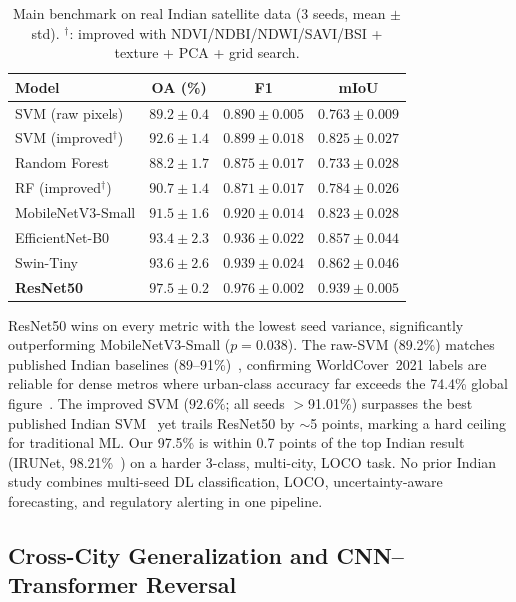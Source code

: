 \documentclass[conference]{IEEEtran}
\begin{document}
\begin{table}[t]
\centering
\caption{Main benchmark on real Indian satellite data (3 seeds, mean $\pm$ std). $^\dagger$: improved with NDVI/NDBI/NDWI/SAVI/BSI + texture + PCA + grid search.}
\label{tab:main}
\footnotesize
\begin{tabular}{lccc}
\toprule
Model & OA (\%) & F1 & mIoU\\
\midrule
SVM (raw pixels)       & $89.2 \pm 0.4$ & $0.890 \pm 0.005$ & $0.763 \pm 0.009$\\
SVM (improved$^\dagger$)& $92.6 \pm 1.4$ & $0.899 \pm 0.018$ & $0.825 \pm 0.027$\\
Random Forest          & $88.2 \pm 1.7$ & $0.875 \pm 0.017$ & $0.733 \pm 0.028$\\
RF (improved$^\dagger$) & $90.7 \pm 1.4$ & $0.871 \pm 0.017$ & $0.784 \pm 0.026$\\
\midrule
MobileNetV3-Small      & $91.5 \pm 1.6$ & $0.920 \pm 0.014$ & $0.823 \pm 0.028$\\
EfficientNet-B0        & $93.4 \pm 2.3$ & $0.936 \pm 0.022$ & $0.857 \pm 0.044$\\
Swin-Tiny              & $93.6 \pm 2.6$ & $0.939 \pm 0.024$ & $0.862 \pm 0.046$\\
\textbf{ResNet50}      & $\mathbf{97.5 \pm 0.2}$ & $\mathbf{0.976 \pm 0.002}$ & $\mathbf{0.939 \pm 0.005}$\\
\bottomrule
\end{tabular}
\end{table}

ResNet50 wins on every metric with the lowest seed variance, significantly outperforming MobileNetV3-Small ($p = 0.038$). The raw-SVM (89.2\%) matches published Indian baselines (89--91\%)~\cite{chamoli2024}, confirming WorldCover~2021 labels are reliable for dense metros where urban-class accuracy far exceeds the 74.4\% global figure~\cite{zanaga2022}. The improved SVM ($92.6\%$; all seeds $>$91.01\%) surpasses the best published Indian SVM~\cite{chamoli2024} yet trails ResNet50 by $\sim$5 points, marking a hard ceiling for traditional ML. Our 97.5\% is within 0.7 points of the top Indian result (IRUNet, 98.21\%~\cite{katpadi2025}) on a harder 3-class, multi-city, LOCO task. No prior Indian study combines multi-seed DL classification, LOCO, uncertainty-aware forecasting, and regulatory alerting in one pipeline.

\subsection{Cross-City Generalization and CNN--Transformer Reversal}
\end{document}
